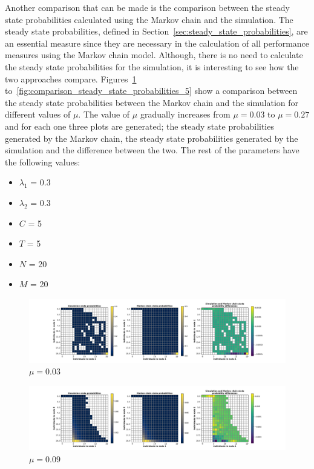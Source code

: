 Another comparison that can be made is the comparison between the steady state
probabilities calculated using the Markov chain and the simulation.
The steady state probabilities, defined in
Section~\ref{sec:steady_state_probabilities}, are an essential measure since
they are necessary in the calculation of all performance measures using the
Markov chain model.
Although, there is no need to calculate the steady state probabilities for the
simulation, it is interesting to see how the two approaches compare.
Figures~\ref{fig:comparison_steady_state_probabilities_1}
to~\ref{fig:comparison_steady_state_probabilities_5} show a comparison between
the steady state probabilities between the Markov chain and the simulation
for different values of \(\mu\).
The value of \(\mu\) gradually increases from \(\mu = 0.03\) to \(\mu = 0.27\)
and for each one three plots are generated; the steady state probabilities
generated by the Markov chain, the steady state probabilities generated by the
simulation and the difference between the two.
The rest of the parameters have the following values:

\begin{multicols}{2}
    \begin{itemize}
        \item \(\lambda_1\) = 0.3
        \item \(\lambda_2\) = 0.3
        \item \(C\) = 5
        \item \(T\) = 5
        \item \(N\) = 20
        \item \(M\) = 20
    \end{itemize}
\end{multicols}


\begin{figure}[H]
    \includegraphics[width=\textwidth, trim=100 10 100 10, clip]{chapters/03_queueing_model/img/numeric_results_and_timings/steady_state_probabilities/main_1.pdf}
    \caption{\(\mu = 0.03\)}
    \label{fig:comparison_steady_state_probabilities_1}
\end{figure}

\begin{figure}[H]
    \includegraphics[width=\textwidth, trim=100 10 100 10, clip]{chapters/03_queueing_model/img/numeric_results_and_timings/steady_state_probabilities/main_3.pdf}
    \caption{\(\mu = 0.09\)}
    \label{fig:comparison_steady_state_probabilities_2}
\end{figure}

